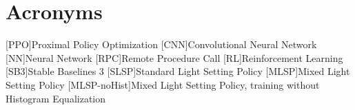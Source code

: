 \chapter*{Acronyms}

\begin{acronym}
    [PPO]{Proximal Policy Optimization}
    [CNN]{Convolutional Neural Network}
    [NN]{Neural Network}
    [RPC]{Remote Procedure Call}
    [RL]{Reinforcement Learning}
    [SB3]{Stable Baselines 3}
    [SLSP]{Standard Light Setting Policy}
    [MLSP]{Mixed Light Setting Policy} %
    [MLSP-noHist]{Mixed Light Setting Policy, training without Histogram Equalization} %
\end{acronym}



